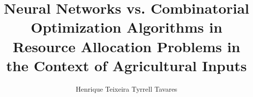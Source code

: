 \documentclass[]{article}
\title{Neural Networks vs. Combinatorial Optimization Algorithms in Resource Allocation Problems in the Context of Agricultural Inputs}
\author{Henrique Teixeira Tyrrell Tavares}
\begin{document}
\maketitle

\begin{abstract}

\end{abstract}

\section{}
\end{document}
